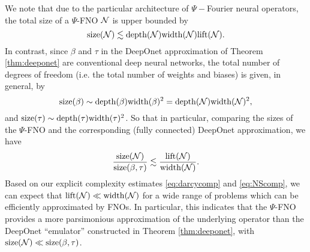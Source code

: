 \documentclass[reqno,a4paper]{amsart}
\begin{document}
\begin{remark}
We note that due to the particular architecture of $\Psi-$Fourier neural operators, the total size of a $\Psi$-FNO $\mathcal{N}$ is upper bounded by 
\[
\mathrm{size}(\mathcal{N}) \lesssim \mathrm{depth}(\mathcal{N}) \mathrm{width}(\mathcal{N}) \mathrm{lift}(\mathcal{N}).
\]
 In contrast, since $\beta$ and $\tau$ in the DeepOnet approximation of Theorem \ref{thm:deeponet} are conventional deep neural networks, the total number of degrees of freedom (i.e. the total number of weights and biases) is given, in general, by 
\[
\mathrm{size}(\beta) 
\sim \mathrm{depth}(\beta) \mathrm{width}(\beta)^2
=
\mathrm{depth}(\mathcal{N}) \mathrm{width}(\mathcal{N})^2,
\]
and $\mathrm{size}(\tau) \sim \mathrm{depth}(\tau) \mathrm{width}(\tau)^2$. So that in particular, comparing the sizes of the $\Psi$-FNO and the corresponding (fully connected) DeepOnet approximation, we have
\[
\frac{\mathrm{size}(\mathcal{N})}{\mathrm{size}(\beta,\tau)}
\lesssim
\frac{\mathrm{lift}(\mathcal{N})}{\mathrm{width}(\mathcal{N})}.
\]
Based on our explicit complexity estimates \eqref{eq:darcycomp} and \eqref{eq:NScomp}, we can expect that $\mathrm{lift}(\mathcal{N}) \ll \mathrm{width}(\mathcal{N})$ for a wide range of problems which can be efficiently approximated by FNOs. In particular, this indicates that the $\Psi$-FNO provides a more parsimonious approximation of the underlying operator than the DeepOnet ``emulator'' constructed in Theorem \ref{thm:deeponet}, with $\mathrm{size}(\mathcal{N}) \ll \mathrm{size}(\beta,\tau)$.
\end{remark}
\end{document}
